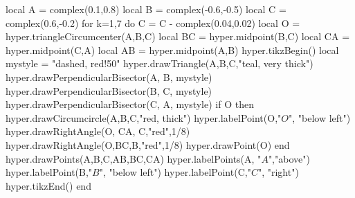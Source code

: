 \documentclass[margin=.2cm,multi,tikz]{standalone}
\begin{document}
\begin{luacode*}
local A = complex(0.1,0.8)
local B = complex(-0.6,-0.5)
local C = complex(0.6,-0.2)
for k=1,7 do
		C = C - complex(0.04,0.02)
	local O = hyper.triangleCircumcenter(A,B,C)
	local BC = hyper.midpoint(B,C)
	local CA = hyper.midpoint(C,A)
	local AB = hyper.midpoint(A,B)
	hyper.tikzBegin()
	local mystyle = "dashed, red!50"
	hyper.drawTriangle(A,B,C,"teal, very thick")
	hyper.drawPerpendicularBisector(A, B, mystyle)
	hyper.drawPerpendicularBisector(B, C, mystyle)
	hyper.drawPerpendicularBisector(C, A, mystyle)
	if O then 
		hyper.drawCircumcircle(A,B,C,"red, thick")
		hyper.labelPoint(O,"$O$", "below left")
		hyper.drawRightAngle(O, CA, C,"red",1/8)
		hyper.drawRightAngle(O,BC,B,"red",1/8)
		hyper.drawPoint(O)
	end
	hyper.drawPoints(A,B,C,AB,BC,CA)
	hyper.labelPoints(A, "$A$","above")
	hyper.labelPoint(B,"$B$", "below left")
	hyper.labelPoint(C,"$C$", "right")
	hyper.tikzEnd()
end
\end{luacode*}
\end{document}
